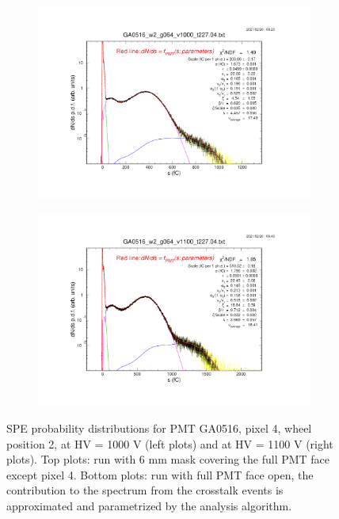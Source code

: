 \begin{figure}[b]
\begin{subfigure}[c]{0.42\linewidth}
		\centering
		\includegraphics[width=\linewidth, trim={6cm 6cm 75mm 85mm},clip]{figures/GA0516_w2_g064_v1000_raw_log.04.png}
		\vspace{0mm}
	\end{subfigure}%
	\begin{subfigure}[c]{0.42\linewidth}
		\centering
		\includegraphics[width=\linewidth, trim={75mm 6cm 6cm 85mm},clip]{figures/GA0516_w2_g064_v1100_raw_log.04.png}
		\vspace{0mm}
	\end{subfigure}%
	\caption{SPE probability distributions for PMT GA0516, pixel 4, wheel position 2, at HV = 1000 V (left plots) and at HV = 1100 V (right plots). Top plots: run with 6 mm mask covering the full PMT face except pixel 4. Bottom plots: run with full PMT face open, the contribution to the spectrum from the crosstalk events is approximated and parametrized by the analysis algorithm.}
	\label{fig:GA0516_w2_fits}
\end{figure}

